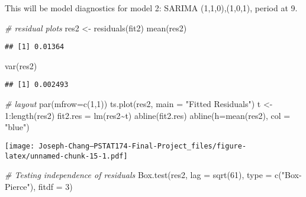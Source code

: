 \documentclass[
]{article}
\newenvironment{Shaded}{\begin{snugshade}}{\end{snugshade}}
\newcommand{\AttributeTok}[1]{\textcolor[rgb]{0.77,0.63,0.00}{#1}}
\newcommand{\CommentTok}[1]{\textcolor[rgb]{0.56,0.35,0.01}{\textit{#1}}}
\newcommand{\DecValTok}[1]{\textcolor[rgb]{0.00,0.00,0.81}{#1}}
\newcommand{\FunctionTok}[1]{\textcolor[rgb]{0.00,0.00,0.00}{#1}}
\newcommand{\NormalTok}[1]{#1}
\newcommand{\OtherTok}[1]{\textcolor[rgb]{0.56,0.35,0.01}{#1}}
\newcommand{\SpecialCharTok}[1]{\textcolor[rgb]{0.00,0.00,0.00}{#1}}
\newcommand{\StringTok}[1]{\textcolor[rgb]{0.31,0.60,0.02}{#1}}
\begin{document}
This will be model diagnostics for model 2: SARIMA (1,1,0),(1,0,1),
period at 9.

\begin{Shaded}
\begin{Highlighting}[]
\CommentTok{\# residual plots}
\NormalTok{res2 }\OtherTok{\textless{}{-}} \FunctionTok{residuals}\NormalTok{(fit2)}
\FunctionTok{mean}\NormalTok{(res2)}
\end{Highlighting}
\end{Shaded}

\begin{verbatim}
## [1] 0.01364
\end{verbatim}

\begin{Shaded}
\begin{Highlighting}[]
\FunctionTok{var}\NormalTok{(res2)}
\end{Highlighting}
\end{Shaded}

\begin{verbatim}
## [1] 0.002493
\end{verbatim}

\begin{Shaded}
\begin{Highlighting}[]
\CommentTok{\# layout}
\FunctionTok{par}\NormalTok{(}\AttributeTok{mfrow=}\FunctionTok{c}\NormalTok{(}\DecValTok{1}\NormalTok{,}\DecValTok{1}\NormalTok{))}
\FunctionTok{ts.plot}\NormalTok{(res2, }\AttributeTok{main  =} \StringTok{"Fitted Residuals"}\NormalTok{)}
\NormalTok{t }\OtherTok{\textless{}{-}} \DecValTok{1}\SpecialCharTok{:}\FunctionTok{length}\NormalTok{(res2)}
\NormalTok{fit2.res }\OtherTok{=} \FunctionTok{lm}\NormalTok{(res2}\SpecialCharTok{\textasciitilde{}}\NormalTok{t)}
\FunctionTok{abline}\NormalTok{(fit2.res)}
\FunctionTok{abline}\NormalTok{(}\AttributeTok{h=}\FunctionTok{mean}\NormalTok{(res2), }\AttributeTok{col =} \StringTok{"blue"}\NormalTok{)}
\end{Highlighting}
\end{Shaded}

\texttt{[image: Joseph-Chang---PSTAT174-Final-Project\_files/figure-latex/unnamed-chunk-15-1.pdf]}

\begin{Shaded}
\begin{Highlighting}[]
\CommentTok{\# Testing independence of residuals}
\FunctionTok{Box.test}\NormalTok{(res2, }\AttributeTok{lag =} \FunctionTok{sqrt}\NormalTok{(}\DecValTok{61}\NormalTok{), }\AttributeTok{type =} \FunctionTok{c}\NormalTok{(}\StringTok{"Box{-}Pierce"}\NormalTok{), }\AttributeTok{fitdf =} \DecValTok{3}\NormalTok{)}
\end{Highlighting}
\end{Shaded}
\end{document}
